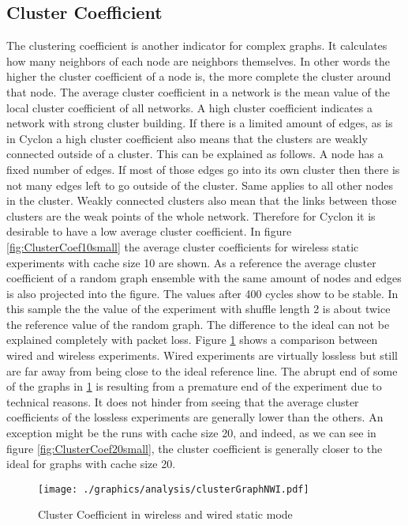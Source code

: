 \subsection{Cluster Coefficient}
The clustering coefficient is another indicator for complex graphs. It
calculates how many neighbors of each node are neighbors themselves. In other
words the higher the cluster coefficient of a node is, the more complete the
cluster around that node. The average cluster coefficient in a network is the
mean value of the local cluster coefficient of all networks. A high cluster
coefficient indicates a network with strong cluster building. If there is a
limited amount of edges, as is in Cyclon a high cluster coefficient also means
that the clusters are weakly connected outside of a cluster. This can be
explained as follows. A node has a fixed number of edges. If most of those edges
go into its own cluster then there is not many edges left to go outside of the
cluster. Same applies to all other nodes in the cluster. Weakly connected
clusters also mean that the links between those clusters are the weak points of
the whole network. Therefore for Cyclon it is desirable to have a low
average cluster coefficient. 
In figure \ref{fig:ClusterCoef10small} the average
cluster coefficients for wireless static experiments with cache size 10 are
shown. As a reference the average cluster coefficient of a random graph ensemble
with the same amount of nodes and edges is also projected into the figure. The
values after 400 cycles show to be stable. In this sample the the value of the
experiment with shuffle length 2 is about twice the reference value of the
random graph. The difference to the ideal can not be explained completely with
packet loss. Figure \ref{fig:ClusterCoefNWI} shows a comparison between
wired and wireless experiments. Wired experiments are virtually lossless but still are
far away from being close to the ideal reference line. The abrupt end of some of
the graphs in \ref{fig:ClusterCoefNWI} is resulting from a premature end of
the experiment due to technical reasons. It does not hinder from seeing that the
average cluster coefficients of the lossless experiments are generally lower
than the others. An exception might be the runs with cache size 20, and indeed,
as we can see in figure \ref{fig:ClusterCoef20small}, the cluster coefficient is
generally closer to the ideal for graphs with cache size 20.

\begin{figure}
	\centering
	\texttt{[image: ./graphics/analysis/clusterGraphNWI.pdf]}
	\caption{Cluster Coefficient in wireless and wired static mode}
	\label{fig:ClusterCoefNWI}
\end{figure}

